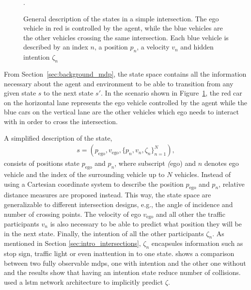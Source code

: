 \begin{figure}[h]
	\caption{General description of the states in a simple intersection. The ego vehicle in red is controlled by the agent, while the blue vehicles are the other vehicles crossing the same intersection. Each blue vehicle is described by an index $n$, a position $p_n$, a velocity $v_n$  and hidden intention $\zeta_n$}.
	\label{fig:intersection_scenario}
	\end{figure}

From Section~\ref{sec:background_mdp}, the state space contains all the information necessary about the agent and environment to be able to transition from any given state $s$ to the next state $s'$. In the scenario shown in Figure~\ref{fig:intersection_scenario}, the red car on the horizontal lane represents the ego vehicle controlled by the agent while the blue cars on the vertical lane are the other vehicles which ego needs to interact with in order to cross the intersection. 

A simplified description of the state, 
\begin{align}
	s = (p_\mathrm{ego}, v_\mathrm{ego}, \{p_{n}, v_n, \zeta_n\}_{n=1}^N), 
	\label{eq:state}
\end{align}
consists of positions state $p_\mathrm{ego}$ and $p_n$, where subscript \textit(ego) and $n$ denotes ego vehicle and the index of the surrounding vehicle up to $N$ vehicles. 
Instead of using a Cartesian coordinate system to describe the position $p_\mathrm{ego}$ and $p_n$, relative distance measures are proposed instead. This way, the state space are generalizable to different intersection designs, e.g., the angle of incidence and number of crossing points. 
The velocity of ego $v_\mathrm{ego}$ and all other the traffic participants $v_n$ is also necessary to be able to predict what position they will be in the next state. Finally, the intention of all the other participants $\zeta_n$. As mentioned in Section \ref{sec:intro_intersections}, $\zeta_n$ encapsules information such as stop sign, traffic light or even inattention in to one state. 
\paperBelief shows a comparison between two fully observable \gls{mdp}s, one with intention and the other one without and the results show that having an intention state reduce number of collisions. 
\paperLSTM used a \gls{lstm} network architecture to implicitly predict $\zeta$. %

